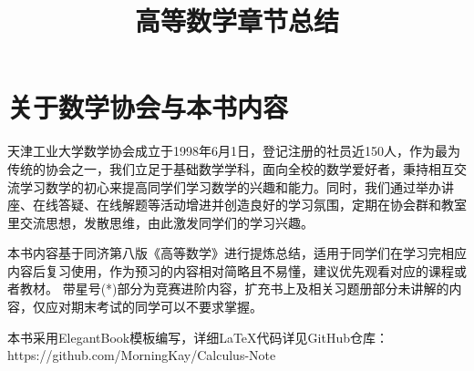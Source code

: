 \documentclass[lang=cn,10pt,scheme=chinese,toc=twocol]{elegantbook}
\title{高等数学章节总结}
\institute{数学协会}
\numberwithin{figure}{section}
\numberwithin{table}{section}
\begin{document}
    \maketitle
    \frontmatter
    
    \tableofcontents
    
    \mainmatter
    
    \chapter*{关于数学协会与本书内容}
    天津工业大学数学协会成立于1998年6月1日，登记注册的社员近150人，作为最为传统的协会之一，我们立足于基础数学学科，面向全校的数学爱好者，秉持相互交流学习数学的初心来提高同学们学习数学的兴趣和能力。同时，我们通过举办讲座、在线答疑、在线解题等活动增进并创造良好的学习氛围，定期在协会群和教室里交流思想，发散思维，由此激发同学们的学习兴趣。

    本书内容基于同济第八版《高等数学》进行提炼总结，适用于同学们在学习完相应内容后复习使用，作为预习的内容相对简略且不易懂，建议优先观看对应的课程或者教材。
    带星号(*)部分为竞赛进阶内容，扩充书上及相关习题册部分未讲解的内容，仅应对期末考试的同学可以不要求掌握。

    本书采用ElegantBook模板编写，详细LaTeX代码详见GitHub仓库：https://github.com/MorningKay/Calculus-Note

    
    
    
    
    
    
    
    
    
    
    
    
    
\end{document}
